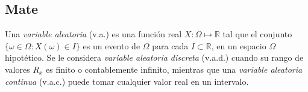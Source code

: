 \subsection {Mate}
Una \emph{variable aleatoria} (v.a.) es una función real $X: \Omega\mapsto\mathbb{R}$ tal que el conjunto $\{\omega\in\Omega:X(\omega)\in I\}$ es un evento de $\Omega$ para cada $I\subset\mathbb{R}$, en un espacio $\Omega$ hipotético. Se le considera \emph{variable aleatoria discreta} (v.a.d.) cuando su rango de valores $R_x$ es finito o contablemente infinito, mientras que una \emph{variable aleatoria continua} (v.a.c.) puede tomar cualquier valor real en un intervalo.



